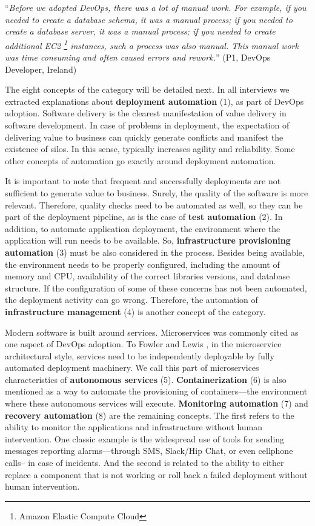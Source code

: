 \begin{mq}
``\emph{Before we adopted DevOps, there was a lot of manual work. For example, if you
needed to create a database schema, it was a manual process; if you needed to create a
database server, it was a manual process; if you needed to create additional EC2 \footnote{Amazon Elastic
Compute Cloud} instances, such a process was also manual.
This manual work was time consuming and often caused errors and
rework.}'' (P1, DevOps Developer, Ireland)
\end{mq}

The eight concepts of the  category will be detailed next.
In all interviews we extracted explanations about \textbf{deployment
automation} (1), as part of DevOps adoption. Software delivery is the clearest
manifestation of value delivery in software development. In case of problems
in deployment, the expectation of delivering value to business can quickly
generate conflicts and manifest the existence of silos.
In this sense,  typically increases agility and reliability. Some other
concepts of automation go exactly around deployment automation.

It is important to note that frequent and successfully
deployments are not sufficient to generate value to business. Surely, the quality of
the software is more relevant. Therefore, quality checks need to be automated as well, so they can be part of the
deployment pipeline, as is the case of \textbf{test automation} (2). In addition, to
automate application deployment, the environment where the
application will run needs to be available. So, \textbf{infrastructure
provisioning automation} (3) must be also considered in the process. Besides being available,
the environment needs to be properly configured, including the amount of memory and CPU,
availability of the correct libraries versions, and database structure. If the configuration of some of these concerns
has not been automated, the deployment activity can go wrong. Therefore,
the automation of \textbf{infrastructure management} (4) is another
concept of the  category.

Modern software is built around services. Microservices  was commonly cited
as one aspect of DevOps adoption. To Fowler and Lewis
\cite{martinfowler2014microservices}, in the
microservice architectural style, services need to be independently deployable
by fully automated deployment machinery. We call this part of microservices
characteristics of \textbf{autonomous services} (5). \textbf{Containerization}
(6) is also mentioned as a way to automate the provisioning of containers---the
environment where these autonomous services will execute.
\textbf{Monitoring automation} (7) and \textbf{recovery automation} (8) are the
remaining concepts. The first refers to the ability to monitor the
applications and infrastructure without human intervention. One classic example
is the widespread use of tools for sending messages reporting
alarms---through SMS, Slack/Hip Chat, or even
cellphone calls-- in case of incidents. And the second is related to the ability
to either replace a component that is not working or
roll back a failed deployment without human intervention.

